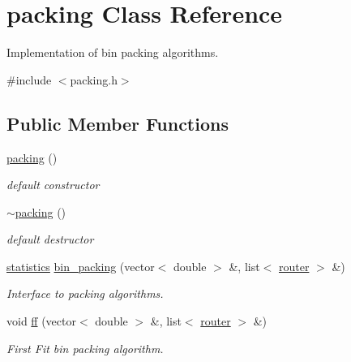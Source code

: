\hypertarget{classpacking}{
\section{packing Class Reference}
\label{classpacking}
}


Implementation of bin packing algorithms.  




{\ttfamily \#include $<$packing.h$>$}

\subsection*{Public Member Functions}
\begin{DoxyCompactItemize}
\item 
\hyperlink{classpacking_ad0cae9459a9abfe4bf76642a232ec2f3}{packing} ()
\begin{DoxyCompactList}\small\item\em default constructor \item\end{DoxyCompactList}\item 
\hyperlink{classpacking_a985cd1712c1e0c7e9f3927e847383810}{$\sim$packing} ()
\begin{DoxyCompactList}\small\item\em default destructor \item\end{DoxyCompactList}\item 
\hyperlink{classstatistics}{statistics} \hyperlink{classpacking_aa80d123e13482fc9760fd87e44f27e0f}{bin\_\-packing} (vector$<$ double $>$ \&, list$<$ \hyperlink{classrouter}{router} $>$ \&)
\begin{DoxyCompactList}\small\item\em Interface to packing algorithms. \item\end{DoxyCompactList}\item 
void \hyperlink{classpacking_acd308605e21d05122f19b6673f7496a2}{ff} (vector$<$ double $>$ \&, list$<$ \hyperlink{classrouter}{router} $>$ \&)
\begin{DoxyCompactList}\small\item\em First Fit bin packing algorithm. \item\end{DoxyCompactList}\end{DoxyCompactItemize}


